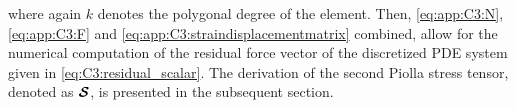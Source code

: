 %
where again $k$ denotes the polygonal degree of the element. Then, \eqref{eq:app:C3:N}, \eqref{eq:app:C3:F} and \eqref{eq:app:C3:straindisplacementmatrix} combined, allow for the numerical computation of the residual force vector of the discretized PDE system given in \eqref{eq:C3:residual_scalar}. The derivation of the second Piolla stress tensor, denoted as $\boldsymbol{\mathcal{S}}$, is presented in the subsequent section.